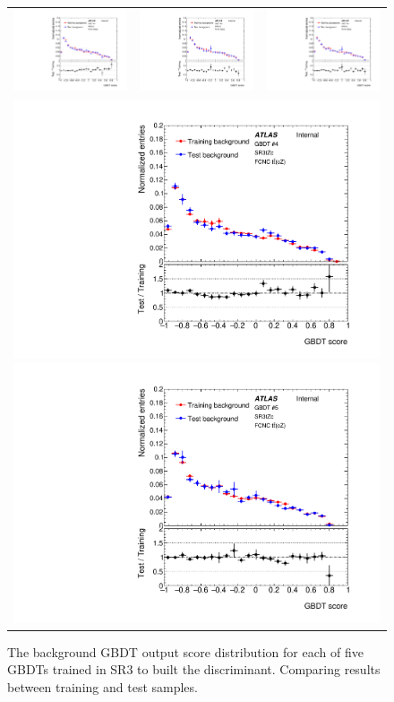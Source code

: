 \begin{figure}[htbp]
	\centering
	\begin{tabular}{ccc}
		\includegraphics[width=.3\textwidth]{Chapters/CH5/figures/SR3_UsingSMT/BDT/GBDT_background_Fold1} &
		\includegraphics[width=.3\textwidth]{Chapters/CH5/figures/SR3_UsingSMT/BDT/GBDT_background_Fold2} &
		\includegraphics[width=.3\textwidth]{Chapters/CH5/figures/SR3_UsingSMT/BDT/GBDT_background_Fold3} \\ 
		\multicolumn{3}{c}{
		\includegraphics[width=.3\textwidth]{Chapters/CH5/figures/SR3_UsingSMT/BDT/GBDT_background_Fold4}
		\includegraphics[width=.3\textwidth]{Chapters/CH5/figures/SR3_UsingSMT/BDT/GBDT_background_Fold5}} \\
	\end{tabular}
	\caption{ The background GBDT output score distribution for each of five GBDTs trained in SR3 to built the \Dthree discriminant. 
		Comparing results between training and test samples.
	}%
	\label{fig:separation:SR3:GBDTbkg}
\end{figure}

